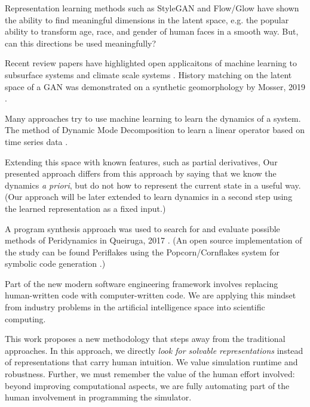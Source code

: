 \documentclass[]{article}
\begin{document}
Representation learning methods such as StyleGAN
\cite{karras_style-based_2018} and Flow/Glow \cite{kingma_glow:_2018} have shown
the ability to find meaningful dimensions in the latent space,
e.g. the popular ability to transform age, race, and gender of human
faces in a smooth way.
But, can this directions be used meaningfully?

Recent review papers have highlighted open applicaitons of machine
learning to subsurface systems \cite{bergen_machine_2019} and
climate scale systems  \cite{reichstein_deep_2019}.
History matching on the latent space of a GAN was demonstrated on a
synthetic geomorphology by Mosser, 2019 \cite{mosser_deepflow:_2019}.

Many approaches try to use machine learning to learn the dynamics of a
system.
The method of Dynamic Mode Decomposition
to learn a linear operator based on time series data \cite{tu_dynamic_2014,kutz_dynamic_2016}. 

Extending this space with known features, such as partial derivatives,
\cite{ one of kutz's students}
Our presented approach differs from this approach by saying that we
know the dynamics {\em a priori}, but do not how to represent the
current state in a useful way. (Our approach will be later extended to
learn dynamics in a second step using the learned representation as a
fixed input.)

\cite{wu_physics-informed_2018}
\cite{xie_tempogan:_2018}

 A program synthesis approach was used to search for and evaluate
 possible methods of Peridynamics in Queiruga, 2017
 \cite{queiruga_numerical_2017}. (An open source implementation of the
 study can be found Periflakes\cite{queiruga_periflakes_2019} using the
 Popcorn/Cornflakes system for symbolic code generation
 \cite{queiruga_cornflakes:_2018,queiruga_popcorn:_2018}.)

Part of the new modern software engineering framework involves replacing
human-written code with computer-written code. We are applying this
mindset from industry problems in the artificial
intelligence space into scientific computing.


This work proposes a new methodology that steps away from the
traditional approaches. 
In this approach, we directly \emph{look for solvable representations}
instead of representations that carry human intuition. We value
simulation runtime and robustness. Further, we must remember the value
of the human effort involved: beyond improving computational aspects,
we are fully automating part of the human involvement in programming
the simulator.
\end{document}
